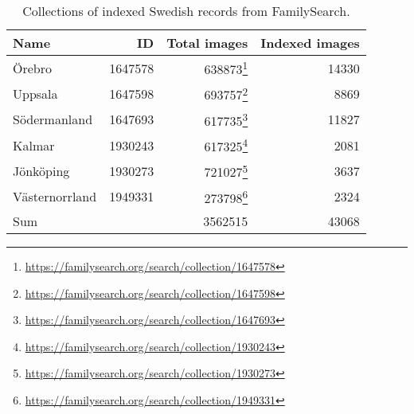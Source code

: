 \begin{table}
\centering
\begin{tabular}{ l r | r r}
Name & ID & Total images & Indexed images \\
\hline
Örebro	& 1647578	& 638873\footnote{\url{https://familysearch.org/search/collection/1647578}}	& 14330 \\
Uppsala	& 1647598	& 693757\footnote{\url{https://familysearch.org/search/collection/1647598}}	& 8869 \\
Södermanland	& 1647693	& 617735\footnote{\url{https://familysearch.org/search/collection/1647693}}	& 11827 \\
Kalmar	& 1930243	& 617325\footnote{\url{https://familysearch.org/search/collection/1930243}}	& 2081 \\
Jönköping	& 1930273	& 721027\footnote{\url{https://familysearch.org/search/collection/1930273}}	& 3637 \\
Västernorrland	& 1949331	& 273798\footnote{\url{https://familysearch.org/search/collection/1949331}}	& 2324 \\
\hline
Sum & & 3562515 & 43068
\end{tabular}
\caption{Collections of indexed Swedish records from FamilySearch.}
\label{tab:collections}
\end{table}
